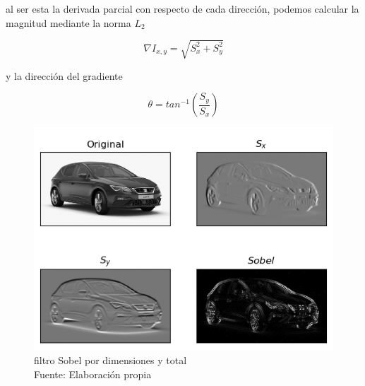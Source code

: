         \noindent al ser esta la derivada parcial con respecto de cada dirección, podemos calcular la magnitud mediante la norma $L_2$
        
        \begin{equation}
            \nabla I_{x, y} = \sqrt{S_x^2 + S_y^2}
        \end{equation}
        
        \noindent y la dirección del gradiente
        
        \begin{equation}
            \theta = tan^{-1}\left(\frac{S_y}{S_x}\right)
        \end{equation}
        
        \begin{figure}[H]
            \centering
            \includegraphics[scale=0.47]{imagenes/sobel_filters}
            \caption{filtro Sobel por dimensiones y total\\ Fuente: Elaboración propia}
        \end{figure}
